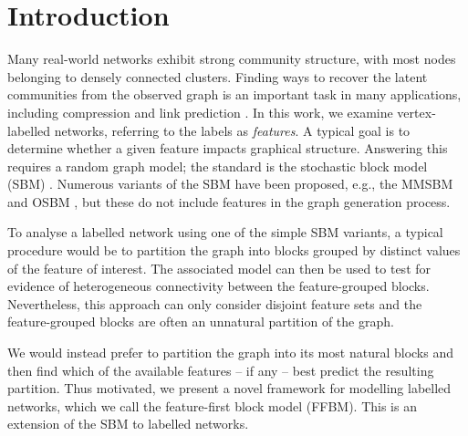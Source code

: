 \section{Introduction}

Many real-world networks exhibit strong community structure, with most nodes belonging to densely connected clusters. 
Finding ways to recover the latent communities from the observed graph is an important
task in many applications,
including
compression \cite{cluster-compression} and link prediction 
\cite{link-prediction}.
In this work, we examine vertex-labelled networks, 
referring to the labels as {\em features}. A typical goal is to determine whether a given feature impacts graphical structure. Answering this requires a random graph model; the standard is the stochastic block model (SBM) \cite{vanilla-sbm}. Numerous variants of the SBM  have been proposed, e.g., the MMSBM \cite{mixed-membership-sbm} and OSBM \cite{overlapping-sbm}, but these do not include features in the graph generation process.

To analyse a labelled network using one of the simple SBM variants, a typical procedure would be to partition the graph into blocks grouped by distinct values of the feature of interest. The associated model can then be used to test for evidence of heterogeneous connectivity between the feature-grouped blocks. Nevertheless, this approach can only consider disjoint feature sets and the feature-grouped blocks are often an unnatural partition of the graph.

We would instead prefer to partition the graph into its most natural blocks and then find which of the available features -- if any -- best predict the resulting partition. Thus motivated, we present a novel framework for modelling labelled networks, which we call the feature-first block model (FFBM). This is an extension of the SBM to labelled networks.
